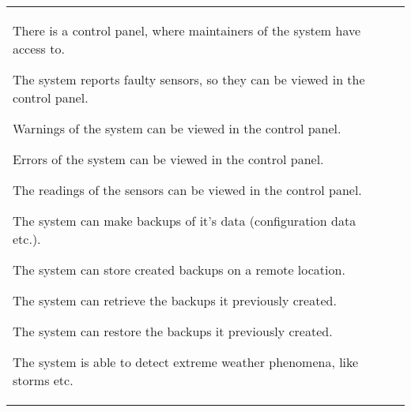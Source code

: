 \begin{longtable}{L{0.1\textwidth} L{0.12\textwidth} L{0.78\textwidth}}
    { There is a control panel, where maintainers of the system have access to. }  %
    
    { The system reports faulty sensors, so they can be viewed in the control panel. }
    
    { Warnings of the system can be viewed in the control panel. }

	{ Errors of the system can be viewed in the control panel. }
	
	{ The readings of the sensors can be viewed in the control panel. }
    
    
    { The system can make backups of it's data (configuration data etc.). }
    
    { The system can store created backups on a remote location. }
      
    { The system can retrieve the backups it previously created. }
    
    { The system can restore the backups it previously created. }

    { The system is able to detect extreme weather phenomena, like storms etc. }
    
    \bottomrule
\end{longtable}